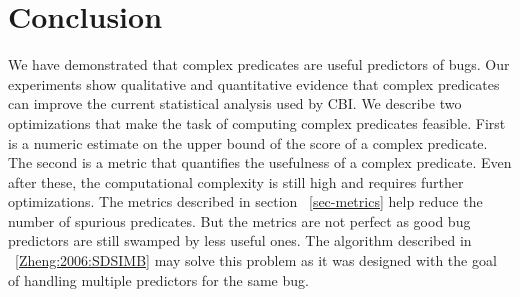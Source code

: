 \section{Conclusion}
\label{sec-conc}
We have demonstrated that complex predicates are useful predictors of bugs.  Our experiments show qualitative and quantitative evidence that complex predicates can improve the current statistical analysis used by CBI.  We describe two optimizations that make the task of computing complex predicates feasible.  First is a numeric estimate on the upper bound of the score of a complex predicate.  The second is a metric that quantifies the usefulness of a complex predicate.  Even after these, the computational complexity is still high and requires further optimizations.  The metrics described in section ~\ref{sec-metrics} help reduce the number of spurious predicates.  But the metrics are not perfect as good bug predictors are still swamped by less useful ones.  The algorithm described in ~\ref{Zheng:2006:SDSIMB} may solve this problem as it was designed with the goal of handling multiple predictors for the same bug.